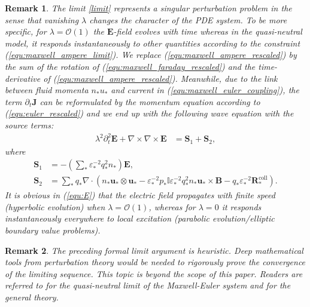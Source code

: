 \documentclass{article}
\newtheorem*{remark}{Remark}
\begin{document}
\begin{remark}
  \label{rem:limit}
  The limit \eqref{limit} represents a \emph{singular perturbation problem} in the sense
  that vanishing $\lambda$ changes the character of the PDE system. To be more specific,
  for $\lambda = \mathcal{O}(1)$ the $\mathbf{E}$-field evolves with time whereas in the
  quasi-neutral model, it responds instantaneously to other quantities according to the
  constraint (\ref{equ:maxwell_ampere_limit}). We replace
  (\ref{equ:maxwell_ampere_rescaled}) by the sum of the rotation of
  (\ref{equ:maxwell_faraday_rescaled}) and the time-derivative of
  (\ref{equ:maxwell_ampere_rescaled}). Meanwhile, due to the link between fluid momenta
  $n_*u_*$ and current in (\ref{equ:maxwell_euler_coupling}), the term
  $\partial_t\mathbf{J}$ can be reformulated by the momentum equation according to
  (\ref{equ:euler_rescaled}) and we end up with the following wave equation with the source
  terms:
  \begin{align}
    \lambda^2\partial_t^2 \mathbf{E} + \nabla \times \nabla \times \mathbf{E} &= \mathbf{S}_1 + \mathbf{S}_2, \label{equ:E}
  \end{align}
  where
  \begin{align}
    \mathbf{S}_1 &= - \left(\sum_*\varepsilon_*^{-2}q_*^2n_*\right)\mathbf{E}, \\
    \mathbf{S}_2 &= \sum_* q_*\nabla\cdot(n_* \mathbf{u}_* \otimes \mathbf{u}_*
    - \varepsilon_*^{-2}p_*\mathbb{I}\varepsilon_*^{-2}q_*^2n_*\mathbf{u}_*\times\mathbf{B}
    - q_*\varepsilon_*^{-2}\mathbf{R}^\text{coll}_*).
  \end{align}
  It is obvious in (\ref{equ:E}) that the electric field propagates with finite speed
  (hyperbolic evolution) when $\lambda = \mathcal{O}(1)$, whereas for $\lambda = 0$ it
  responds instantaneously everywhere to local excitation (parabolic evolution/elliptic
  boundary value problems).
\end{remark}

\begin{remark}
  The preceding formal limit argument is heuristic. Deep mathematical tools from
  perturbation theory would be needed to rigorously prove the convergence of the limiting
  sequence. This topic is beyond the scope of this paper. Readers are referred to
  \cite[Chapt.~2]{remi_2014} \cite{Peng_2008} for the quasi-neutral limit of the
  Maxwell-Euler system and \cite{mark_1995, Eckhaus_1980} for the general theory.
\end{remark} 
\end{document}
